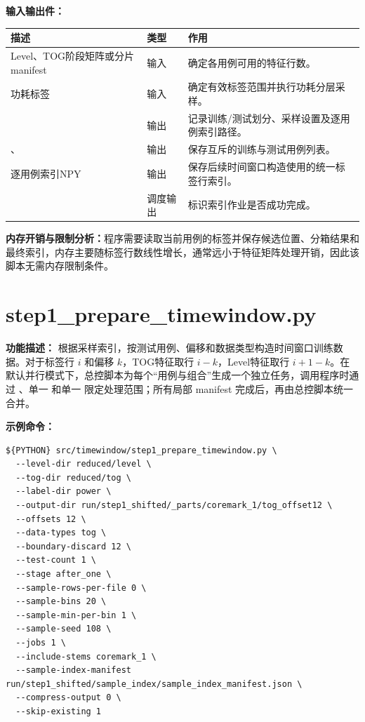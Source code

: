 \textbf{输入输出件：}
\begin{longtable}{L{0.34\textwidth}L{0.13\textwidth}L{0.41\textwidth}}
\toprule 描述 & 类型 & 作用 \\ \midrule
Level、TOG阶段矩阵或分片manifest & 输入 & 确定各用例可用的特征行数。 \\
功耗标签 & 输入 & 确定有效标签范围并执行功耗分层采样。 \\
 & 输出 & 记录训练/测试划分、采样设置及逐用例索引路径。 \\
、 & 输出 & 保存互斥的训练与测试用例列表。 \\
逐用例索引NPY & 输出 & 保存后续时间窗口构造使用的统一标签行索引。 \\
 & 调度输出 & 标识索引作业是否成功完成。 \\
\bottomrule
\end{longtable}

\textbf{内存开销与限制分析：}程序需要读取当前用例的标签并保存候选位置、分箱结果和最终索引，内存主要随标签行数线性增长，通常远小于特征矩阵处理开销，因此该脚本无需内存限制条件。


\section{step1\_prepare\_timewindow.py}

\textbf{功能描述：} 根据采样索引，按测试用例、偏移和数据类型构造时间窗口训练数据。对于标签行 $i$ 和偏移 $k$，TOG特征取行 $i-k$，Level特征取行 $i+1-k$。在默认并行模式下，总控脚本为每个“用例与组合”生成一个独立任务，调用程序时通过 、单一  和单一  限定处理范围；所有局部 manifest 完成后，再由总控脚本统一合并。

\textbf{示例命令：}
\begin{lstlisting}
${PYTHON} src/timewindow/step1_prepare_timewindow.py \
  --level-dir reduced/level \
  --tog-dir reduced/tog \
  --label-dir power \
  --output-dir run/step1_shifted/_parts/coremark_1/tog_offset12 \
  --offsets 12 \
  --data-types tog \
  --boundary-discard 12 \
  --test-count 1 \
  --stage after_one \
  --sample-rows-per-file 0 \
  --sample-bins 20 \
  --sample-min-per-bin 1 \
  --sample-seed 108 \
  --jobs 1 \
  --include-stems coremark_1 \
  --sample-index-manifest run/step1_shifted/sample_index/sample_index_manifest.json \
  --compress-output 0 \
  --skip-existing 1
\end{lstlisting}

